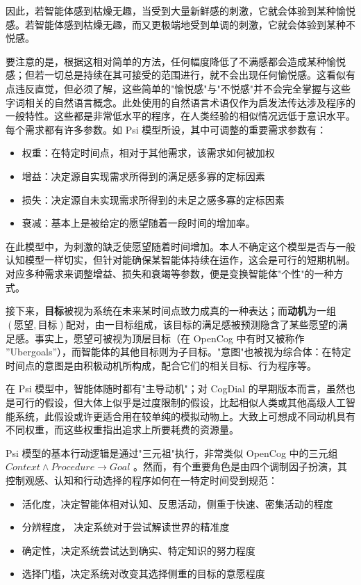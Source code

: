因此，若智能体感到枯燥无趣，当受到大量新鲜感的刺激，它就会体验到某种愉悦感。若智能体感到枯燥无趣，而又更极端地受到单调的刺激，它就会体验到某种不悦感。

要注意的是，根据这相对简单的方法，任何幅度降低了不满感都会造成某种愉悦感；但若一切总是持续在其可接受的范围进行，就不会出现任何愉悦感。这看似有点违反直觉，但必须了解，这些简单的"愉悦感"与"不悦感"并不会完全掌握与这些字词相关的自然语言概念。此处使用的自然语言术语仅作为启发法传达涉及程序的一般特性。这些都是非常低水平的程序，在人类经验的相似情况远低于意识水平。
每个需求都有许多参数。如 Psi 模型所设，其中可调整的重要需求参数有：

\begin{itemize}
\item 权重：在特定时间点，相对于其他需求，该需求如何被加权
\item  增益：决定源自实现需求所得到的满足感多寡的定标因素
\item  损失：决定源自未实现需求所得到的未足之感多寡的定标因素
\item  衰减：基本上是被给定的愿望随着一段时间的增加率。

\end{itemize}

在此模型中，为刺激的缺乏使愿望随着时间增加。本人不确定这个模型是否与一般认知模型一样切实，但针对能确保某智能体持续在运作，这会是可行的短期机制。对应多种需求来调整增益、损失和衰竭等参数，便是变换智能体"个性"的一种方式。

接下来，{\bf 目标}被视为系统在未来某时间点致力成真的一种表达；而{\bf 动机}为一组 $(愿望, 目标)$配对，由一目标组成，该目标的满足感被预测隐含了某些愿望的满足感。事实上，愿望可被视为顶层目标（在 OpenCog 中有时又被称作 ”Ubergoals”），而智能体的其他目标则为子目标。"意图"也被视为综合体：在特定时间点的意图是由积极动机所构成，配合它们的相关目标、行为程序等。

在 Psi 模型中，智能体随时都有"主导动机"；对 CogDial 的早期版本而言，虽然也是可行的假设，但大体上似乎是过度限制的假设，比起相似人类或其他高级人工智能系统，此假设或许更适合用在较单纯的模拟动物上。大致上可想成不同动机具有不同权重，而这些权重指出追求上所要耗费的资源量。

Psi 模型的基本行动逻辑是通过"三元祖"执行，非常类似 OpenCog 中的三元组$\textit{Context} \land \textit{Procedure} \rightarrow \textit{Goal}$ 。然而，有个重要角色是由四个调制因子扮演，其控制观感、认知和行动选择的程序如何在一特定时间受到规范：

\begin{itemize}
\item  活化度，决定智能体相对认知、反思活动，侧重于快速、密集活动的程度 
\item 分辨程度， 决定系统对于尝试解读世界的精准度 
\item 确定性，决定系统尝试达到确实、特定知识的努力程度 
\item 选择门槛，决定系统对改变其选择侧重的目标的意愿程度
\end{itemize}

